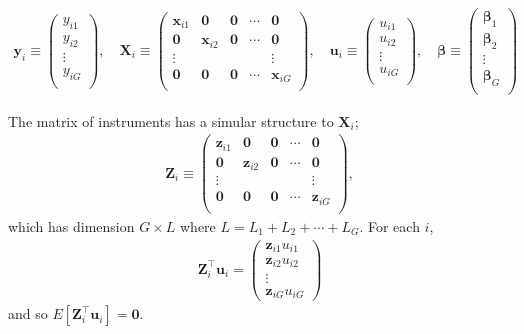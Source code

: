 \documentclass[11pt]{article}
\numberwithin{figure}{section}
\theoremstyle{definition}
\newcommand{\0}{\mathbf{0}}
\newcommand{\bmX}{\bm{X}}
\newcommand{\bmZ}{\bm{Z}}
\newcommand{\bmu}{\bm{u}}
\newcommand{\bmx}{\bm{x}}
\newcommand{\bmy}{\bm{y}}
\newcommand{\bmz}{\bm{z}}
\begin{document}
\begin{align*}
    \bmy_i \equiv 
    \begin{pmatrix}
        y_{i1}\\
        y_{i2}\\
        \vdots\\
        y_{iG}\\
    \end{pmatrix},
    \quad \bmX_i\equiv
    \begin{pmatrix}
        \bmx_{i1} & \bm0 & \bm0 & \cdots & \bm0\\
        \bm0 & \bmx_{i2} & \bm0 & \cdots & \bm0\\
        \vdots &  &  &  & \vdots\\
        \bm0 & \bm0 & \bm0 & \cdots & \bmx_{iG}\\
    \end{pmatrix},
    \quad \bmu_i\equiv
    \begin{pmatrix}
        u_{i1}\\
        u_{i2}\\
        \vdots\\
        u_{iG}\\
    \end{pmatrix},
        \quad \bm{\beta}\equiv
    \begin{pmatrix}
        \bm{\beta}_{1}\\
        \bm{\beta}_{2}\\
        \vdots\\
        \bm{\beta}_{G}\\
    \end{pmatrix}
\end{align*}

The matrix of instruments has a simular structure to $\bmX_i$;
\begin{align*}
    \bmZ_i\equiv
    \begin{pmatrix}
        \bmz_{i1} & \bm0 & \bm0 & \cdots & \bm0\\
        \bm0 & \bmz_{i2} & \bm0 & \cdots & \bm0\\
        \vdots &  &  &  & \vdots\\
        \bm0 & \bm0 & \bm0 & \cdots & \bmz_{iG}\\
    \end{pmatrix},
\end{align*}
which has dimension $G\times L$ where $L = L_1 + L_2 + \cdots + L_G$.
For each $i$, 
\begin{align*}
    \bmZ_i^\top \bmu_i =
    \begin{pmatrix}
        \bmz_{i1} u_{i1}\\
        \bmz_{i2} u_{i2}\\
        \vdots\\
        \bmz_{iG} u_{iG}
    \end{pmatrix}
\end{align*}
and so $E[\bmZ_i^\top \bmu_i] = \bm0$.
\end{document}

